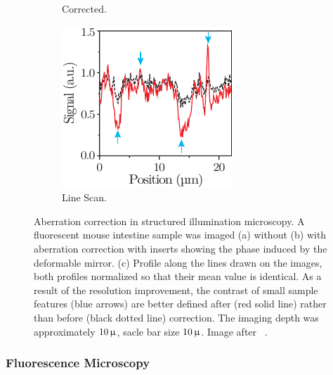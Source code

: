 \begin{figure}[tbh]
\begin{subfigure}[b]{0.3\textwidth}
                \caption{Corrected.}
                \label{fig:SI_corrected}
        \end{subfigure}
        \begin{subfigure}[b]{0.3\textwidth}
                \includegraphics[width=\textwidth]{images/structured_illumination_scan}
                \caption{Line Scan.}
                \label{fig:SI_scan}
        \end{subfigure}
								
        \caption{Aberration correction in structured illumination microscopy. 
A fluorescent mouse intestine sample was imaged (a) without (b) with 
aberration correction with inserts showing the phase induced by the 
deformable mirror. (c) Profile along the lines drawn on the images, both 
profiles normalized so that their mean value is identical. As a result of the 
resolution improvement, the contrast of small sample features (blue arrows) 
are better defined after (red solid line) rather than before (black dotted 
line) correction. The imaging depth was approximately $\unit[10]{\upmu}$, 
sacle bar size $\unit[10]{\upmu}$. Image after~\cite{wide_AOM_structured_illu}
.}
\label{fig:structured_light_correction}
\end{figure} 

\subsubsection{Fluorescence Microscopy}
\label{sec:FlourescnecMicroscopy}

